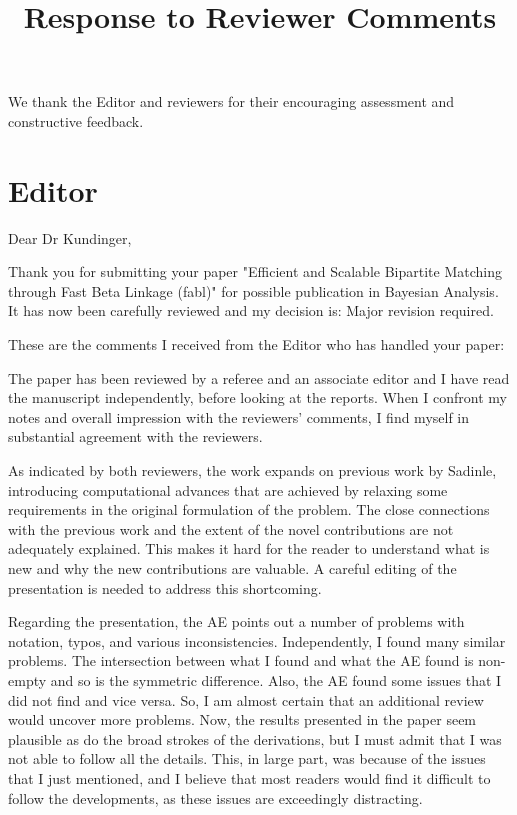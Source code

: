 \documentclass[letterpaper, parskip]{scrartcl}
\begin{document}
	
	
	\title{Response to Reviewer Comments}
	
	\maketitle
	We thank the Editor and reviewers for their encouraging assessment and constructive 
	feedback.
	
	
	\section*{Editor}
	
	Dear Dr Kundinger,
	
	Thank you for submitting your paper "Efficient and Scalable Bipartite Matching through Fast Beta Linkage (fabl)" for possible publication in Bayesian Analysis.
	It has now been carefully reviewed and my decision is: Major revision required.
	
	These are the comments I received from the Editor who has handled your paper:
	
	The paper has been reviewed by a referee and an associate editor and I have read the manuscript independently, before looking at the reports.  When I confront my notes and overall impression with the reviewers’ comments, I find myself in substantial agreement with the reviewers.
	
	As indicated by both reviewers, the work expands on previous work by Sadinle, introducing computational advances that are achieved by relaxing some requirements in the original formulation of the problem.  The close connections with the previous work and the extent of the novel contributions are not adequately explained.  This makes it hard for the reader to understand what is new and why the new contributions are valuable.  A careful editing of the presentation is needed to address this shortcoming.
	
	Regarding the presentation, the AE points out a number of problems with notation, typos, and various inconsistencies.  Independently, I found many similar problems.  The intersection between what I found and what the AE found is non-empty and so is the symmetric difference.  Also, the AE found some issues that I did not find and vice versa.  So, I am almost certain that an additional review would uncover more problems.  Now, the results presented in the paper seem plausible as do the broad strokes of the derivations, but I must admit that I was not able to follow all the details. This, in large part, was because of the issues that I just mentioned, and I believe that most readers would find it difficult to follow the developments, as these issues are exceedingly distracting.
	
\end{document}
